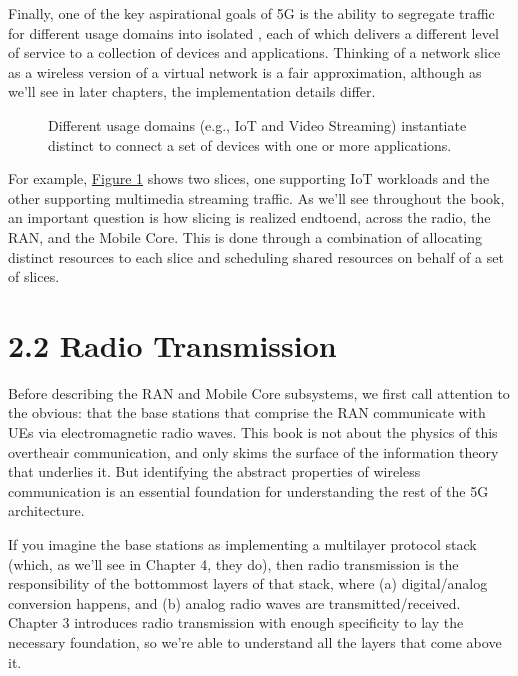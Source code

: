 \documentclass[a4paper,11pt,english]{sphinxmanual}
\let\sphinxpxdimen\pdfpxdimen\else\newdimen\sphinxpxdimen
\begin{document}
\sphinxAtStartPar
Finally, one of the key aspirational goals of 5G is the ability to
segregate traffic for different usage domains into isolated , each of which delivers a different level of service to a
collection of devices and applications. Thinking of a network slice as
a wireless version of a virtual network is a fair approximation,
although as we’ll see in later chapters, the implementation details
differ.

\begin{figure}[ht]
\centering
\capstart

\noindent\sphinxincludegraphics[width=500\sphinxpxdimen]{{Slide4}.png}
\caption{Different usage domains (e.g., IoT and Video Streaming)
instantiate distinct  to connect a set of devices
with one or more applications.}\label{\detokenize{arch:id5}}\label{\detokenize{arch:fig-slice}}\end{figure}

\sphinxAtStartPar
For example, \hyperref[\detokenize{arch:fig-slice}]{Figure \ref{\detokenize{arch:fig-slice}}} shows two slices, one
supporting IoT workloads and the other supporting multimedia streaming
traffic. As we’ll see throughout the book, an important question is
how slicing is realized end\sphinxhyphen{}to\sphinxhyphen{}end, across the radio, the RAN, and the
Mobile Core. This is done through a combination of allocating distinct
resources to each slice and scheduling shared resources on behalf of a
set of slices.


\section{2.2 Radio Transmission}
\label{\detokenize{arch:radio-transmission}}
\sphinxAtStartPar
Before describing the RAN and Mobile Core subsystems, we first call
attention to the obvious: that the base stations that comprise the RAN
communicate with UEs via electromagnetic radio waves. This book is not
about the physics of this over\sphinxhyphen{}the\sphinxhyphen{}air communication, and only skims
the surface of the information theory that underlies it. But
identifying the abstract properties of wireless communication is an
essential foundation for understanding the rest of the 5G
architecture.

\sphinxAtStartPar
If you imagine the base stations as implementing a multi\sphinxhyphen{}layer
protocol stack (which, as we’ll see in Chapter 4, they do), then radio
transmission is the responsibility of the bottom\sphinxhyphen{}most layers of that
stack, where (a) digital/analog conversion happens, and (b) analog
radio waves are transmitted/received. Chapter 3 introduces radio
transmission with enough specificity to lay the necessary foundation,
so we’re able to understand all the layers that come above it.
\end{document}
